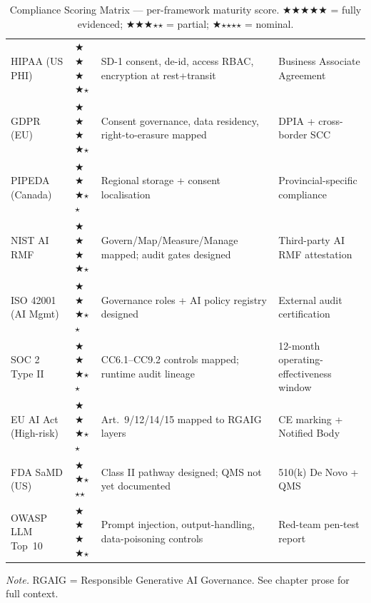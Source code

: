 {\tablestripes\tablefontsize
{}
\begin{xltabular}{\textwidth}{@{} >{\raggedright\arraybackslash}p{2.6cm} >{\centering\arraybackslash}p{2.0cm} L L @{}}
\caption[Compliance Scoring Matrix ($\bigstar$ 0--5)]{Compliance Scoring Matrix --- per-framework maturity score. $\bigstar$$\bigstar$$\bigstar$$\bigstar$$\bigstar$ = fully evidenced; $\bigstar$$\bigstar$$\bigstar$$\star$$\star$ = partial; $\bigstar$$\star$$\star$$\star$$\star$ = nominal.}\label{tab:ch5_compliance_score} \\
\toprule
{} &  &  &  \\
\midrule
\endfirsthead
\endhead
\bottomrule
\endlastfoot
HIPAA (US PHI) & $\bigstar$$\bigstar$$\bigstar$$\bigstar$$\star$ & SD-1 consent, de-id, access RBAC, encryption at rest+transit & Business Associate Agreement \\
GDPR (EU) & $\bigstar$$\bigstar$$\bigstar$$\bigstar$$\star$ & Consent governance, data residency, right-to-erasure mapped & DPIA + cross-border SCC \\
PIPEDA (Canada) & $\bigstar$$\bigstar$$\bigstar$$\star$$\star$ & Regional storage + consent localisation & Provincial-specific compliance \\
NIST AI RMF & $\bigstar$$\bigstar$$\bigstar$$\bigstar$$\star$ & Govern/Map/Measure/Manage mapped; audit gates designed & Third-party AI RMF attestation \\
ISO 42001 (AI Mgmt) & $\bigstar$$\bigstar$$\bigstar$$\star$$\star$ & Governance roles + AI policy registry designed & External audit certification \\
SOC 2 Type II & $\bigstar$$\bigstar$$\bigstar$$\star$$\star$ & CC6.1--CC9.2 controls mapped; runtime audit lineage & 12-month operating-effectiveness window \\
EU AI Act (High-risk) & $\bigstar$$\bigstar$$\bigstar$$\star$$\star$ & Art.~9/12/14/15 mapped to RGAIG layers & CE marking + Notified Body \\
FDA SaMD (US) & $\bigstar$$\bigstar$$\star$$\star$$\star$ & Class II pathway designed; QMS not yet documented & 510(k) De Novo + QMS \\
OWASP LLM Top~10 & $\bigstar$$\bigstar$$\bigstar$$\bigstar$$\star$ & Prompt injection, output-handling, data-poisoning controls & Red-team pen-test report \\
\end{xltabular}}
\vspace{0.3em}\noindent\textit{Note.} RGAIG = Responsible Generative AI Governance. See chapter prose for full context.

